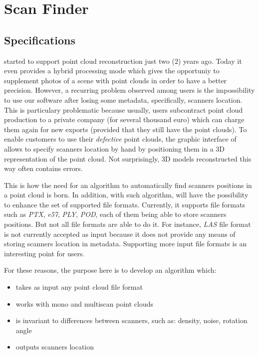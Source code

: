 \chapter{Scan Finder}
\label{ch:scanfinder}

\section{Specifications}
\CC started to support point cloud reconstruction just two (2) years ago. Today it even provides a hybrid processing mode which gives the opportuniy to supplement photos of a scene with point clouds in order to have a better precision. However, a recurring problem observed among \CC users is the impossibility to use our software after losing some metadata, specifically, scanners location. This is particulary problematic because usually, \CC users subcontract point cloud
production
to a private company (for several thousand euro) which can charge them again for new exports (provided that they still have the point clouds). To enable customers to use their \emph{defective} point clouds, the graphic interface of \CC allows to specify scanners location by hand by positioning them in a 3D representation of the point cloud. Not surprisingly, 3D models reconstructed this way often contains errors.

This is how the need for an algorithm to automatically find scanners positions in a point cloud is born. In addition, with such algorithm, \CC will have the possibility to enhance the set of supported file formats. Currently, it supports file formats such as \emph{PTX}, \emph{e57}, \emph{PLY}, \emph{POD}, each of them being able to store scanners positions. But not all file formats are able to do it. For instance, \emph{LAS} file format is not currently accepted as input because it does not provide any
means of storing scanners location in metadata. Supporting more input file formats is an interesting point for \CC users.

For these reasons, the purpose here is to develop an algorithm which:
\begin{itemize}
\item takes as input any point cloud file format
\item works with mono and multiscan point clouds
\item is invariant to differences between scanners, such as: density, noise, rotation angle
\item outputs scanners location
\end{itemize}

